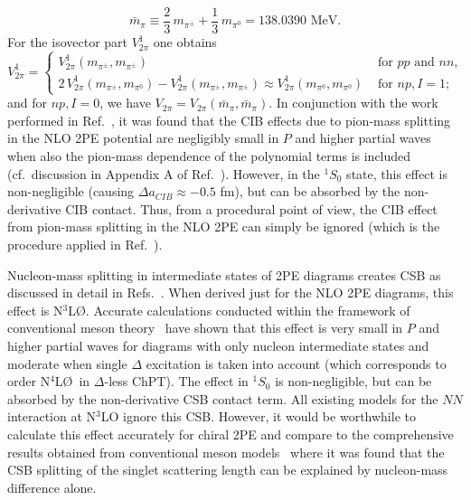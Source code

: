 \documentclass[sort&compress,preprint,3p]{elsarticle}
\begin{document}
 \begin{equation}
 \bar{m}_\pi \equiv \frac23 \, m_{\pi^\pm} + \frac13 \, m_{\pi^0}
 = 138.0390 \mbox{ MeV.}
 \end{equation}
 For the isovector part $V_{2\pi}^1$ one obtains~\cite{FK99,WME01}
 \begin{equation}
 V_{2\pi}^1 = \left\{ \begin{array}{ll}
                  V_{2\pi}^1 (m_{\pi^\pm},m_{\pi^\pm})   & \mbox{ for $pp$ and $nn$,}  \\
                 2 \, V_{2\pi}^1 (m_{\pi^\pm},m_{\pi^0}) - V_{2\pi}^1 (m_{\pi^\pm},m_{\pi^\pm}) 
                 \approx V_{2\pi}^1 (m_{\pi^0},m_{\pi^0}) 
                                                                                & \mbox{ for $np, I=1$;}
                                \end{array}  \right. 
 \end{equation}
 and for $np, I=0$, we have  $V_{2\pi}=V_{2\pi} (\bar{m}_{\pi},\bar{m}_{\pi})$. 
 In conjunction with the work performed in Ref.~\cite{EM03}, it was found that
 the CIB effects due to pion-mass splitting in the NLO 2PE
 potential are negligibly small in $P$ and higher partial waves
 when also the pion-mass dependence of the polynomial terms is included 
(cf.\ discussion in Appendix A of Ref.~\cite{WME01}).
However, in the $^1S_0$ state, this effect is non-negligible
(causing $\Delta a_{CIB} \approx -0.5$ fm), but can be absorbed by the non-derivative
CIB contact. Thus, from a procedural point of view, the CIB effect from pion-mass splitting
in the NLO 2PE can simply be ignored (which is the procedure applied in Ref.~\cite{EM03}).

Nucleon-mass splitting in intermediate states of 2PE diagrams creates CSB
as discussed in detail in Refs.~\cite{Fri03,Fri04}. When derived just  for the NLO 2PE diagrams,
this effect is N$^3$L\O. Accurate calculations
conducted within the framework of conventional meson theory~\cite{LM98a} have shown that this effect
is very small in $P$ and higher partial waves for diagrams with only nucleon intermediate states
and moderate when single $\Delta$ excitation is taken into account (which corresponds to order
N$^4$L\O \, in $\Delta$-less ChPT).
The effect in $^1S_0$ is non-negligible, but can be absorbed by the non-derivative CSB contact term.
All existing models for the $NN$ interaction at N$^3$LO ignore this CSB.
However, it would be worthwhile to calculate this effect accurately for chiral 2PE and compare to the
comprehensive results obtained from conventional meson models~\cite{LM98a} where it was found that the  
CSB splitting of the singlet scattering length can be explained by nucleon-mass difference alone.
\end{document}
